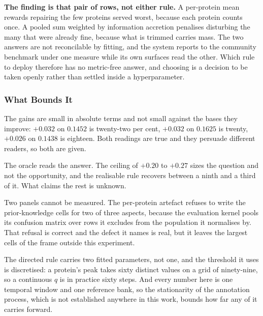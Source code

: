 \textbf{The finding is that pair of rows, not either rule.} A per-protein mean
rewards repairing the few proteins served worst, because each protein counts
once. A pooled sum weighted by information accretion penalises disturbing the
many that were already fine, because what is trimmed carries mass. The two
answers are not reconcilable by fitting, and the system reports to the
community benchmark under one measure while its own surfaces read the other.
Which rule to deploy therefore has no metric-free answer, and choosing is a
decision to be taken openly rather than settled inside a hyperparameter.

\subsubsection{What Bounds It}

The gains are small in absolute terms and not small against the bases they
improve: $+0.032$ on $0.1452$ is twenty-two per cent, $+0.032$ on $0.1625$ is
twenty, $+0.026$ on $0.1438$ is eighteen. Both readings are true and they
persuade different readers, so both are given.

The oracle reads the answer. The ceiling of $+0.20$ to $+0.27$ sizes the
question and not the opportunity, and the realisable rule recovers between a
ninth and a third of it. What claims the rest is unknown.

Two panels cannot be measured. The per-protein artefact refuses to write the
prior-knowledge cells for two of three aspects, because the evaluation kernel
pools its confusion matrix over rows it excludes from the population it
normalises by. That refusal is correct and the defect it names is real, but it
leaves the largest cells of the frame outside this experiment.

The directed rule carries two fitted parameters, not one, and the threshold it
uses is discretised: a protein's peak takes sixty distinct values on a grid of
ninety-nine, so a continuous $q$ is in practice sixty steps. And every number
here is one temporal window and one reference bank, so the stationarity of the
annotation process, which is not established anywhere in this work, bounds how
far any of it carries forward.
